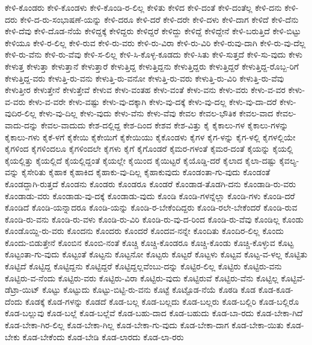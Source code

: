 {ಕೇಳಿ-ಕೊಂಡರು
ಕೇಳಿ-ಕೊಂಡಳು
ಕೇಳಿ-ಕೊಂಡಿ-ರ-ಲಿಲ್ಲ
ಕೇಳಿತು
ಕೇಳಿದ
ಕೇಳಿ-ದಂತೆ
ಕೇಳಿ-ದಂತೆಲ್ಲ
ಕೇಳಿ-ದನು
ಕೇಳಿ-ದರು
ಕೇಳಿ-ದ-ರು-ಸಂಭಾಷಣೆ-ಯನ್ನು
ಕೇಳಿ-ದರೂ
ಕೇಳಿ-ದರೆ
ಕೇಳಿ-ದರೇ
ಕೇಳಿ-ದಳು
ಕೇಳಿ-ದಾಗ
ಕೇಳಿದೆ
ಕೇಳಿ-ದೆನು
ಕೇಳಿ-ದೆವು
ಕೇಳಿ-ದೊಡ-ನೆಯೆ
ಕೇಳಿದ್ದಕ್ಕೆ
ಕೇಳಿದ್ದರು
ಕೇಳಿದ್ದರೆ
ಕೇಳಿದ್ದು
ಕೇಳಿದ್ದೆ
ಕೇಳಿದ್ದೇನೆ
ಕೇಳಿ-ಬರುತ್ತಿದೆ
ಕೇಳಿ-ಬಿಟ್ಟು
ಕೇಳಿಯೂ
ಕೇಳಿ-ರ-ಲಿಲ್ಲ
ಕೇಳಿ-ರುವ
ಕೇಳಿ-ರು-ವರು
ಕೇಳಿ-ರು-ವಿರಾ
ಕೇಳಿ-ರು-ವಿರಿ
ಕೇಳಿ-ರುವು-ದಾಗಿ
ಕೇಳಿ-ರು-ವು-ದೆಲ್ಲ
ಕೇಳಿ-ರು-ವೆನು
ಕೇಳಿ-ರು-ವೆವು
ಕೇಳಿ-ಸ-ಲಿಲ್ಲ
ಕೇಳಿ-ಸಿ-ಕೊಳ್ಳ-ಕೂಡದು
ಕೇಳಿ-ಸಿತು
ಕೇಳಿ-ಸುತ್ತದೆ
ಕೇಳಿ-ಸು-ವುದು
ಕೇಳು
ಕೇಳುತ್ತ
ಕೇಳುತ್ತಾ
ಕೇಳುತ್ತಾನೆ
ಕೇಳುತ್ತಾರೆ
ಕೇಳುತ್ತಿದ್ದ
ಕೇಳುತ್ತಿದ್ದನು
ಕೇಳುತ್ತಿದ್ದರು
ಕೇಳುತ್ತಿದ್ದರೆ
ಕೇಳುತ್ತಿದ್ದ-ರೊಬ್ಬ-ರಿಗೆ
ಕೇಳುತ್ತಿದ್ದ-ವರು
ಕೇಳುತ್ತಿ-ರು-ವನು
ಕೇಳುತ್ತಿ-ರು-ವನೋ
ಕೇಳುತ್ತಿ-ರು-ವರು
ಕೇಳುತ್ತಿ-ರು-ವಿರಿ
ಕೇಳುತ್ತಿ-ರು-ವೆವು
ಕೇಳುತ್ತೀರ
ಕೇಳುತ್ತೇನೆ
ಕೇಳುತ್ತೇವೆ
ಕೇಳುವ
ಕೇಳು-ವಂತಹ
ಕೇಳು-ವಂತೆ
ಕೇಳು-ವನು
ಕೇಳು-ವರು
ಕೇಳು-ವ-ವರ
ಕೇಳು-ವ-ವರು
ಕೇಳು-ವ-ವರೇ
ಕೇಳು-ವಷ್ಟು
ಕೇಳು-ವು-ದಕ್ಕಾಗಿ
ಕೇಳು-ವು-ದಕ್ಕೆ
ಕೇಳು-ವು-ದಲ್ಲ
ಕೇಳು-ವು-ದಾ-ದರೆ
ಕೇಳು-ವುದಿರ-ಲಿಲ್ಲ
ಕೇಳು-ವು-ದಿಲ್ಲ
ಕೇಳು-ವುದು
ಕೇಳು-ವೆನು
ಕೇಳು-ವೆವು
ಕೇವಲ
ಕೇವಲ-ಭೌತಿಕ
ಕೇವಲ-ವಾದ
ಕೇವಲ-ವಾದು-ದನ್ನು
ಕೇವಲ-ವಾದುದು
ಕೇಶ-ದಲ್ಲಿದ್ದ
ಕೇಶ-ದಿಂದ
ಕೇಶವ
ಕೇಶ-ವಿತ್ತು
ಕೈ
ಕೈಕಾಲು-ಗಳ
ಕೈಕಾಲು-ಗಳನ್ನು
ಕೈಕಾಲು-ಗಳು
ಕೈಕೆ-ಳಗೆ
ಕೈಕೇಯಿ
ಕೈಕೇಯಿಗೆ
ಕೈಕೇಯಿಯು
ಕೈಕೊಂಡಳು
ಕೈಗಳ
ಕೈಗ-ಳನ್ನು
ಕೈಗ-ಳಲ್ಲಿ
ಕೈಗಳಲ್ಲಿಯೇ
ಕೈಗಳಿಂದ
ಕೈಗಳಿಂದಲೂ
ಕೈಗಳಿಂದಲೇ
ಕೈಗಳು
ಕೈಗೆ
ಕೈಗೊಂಡರೆ
ಕೈಮರ-ಗಳಂತೆ
ಕೈಮರ-ದಂತೆ
ಕೈಯನ್ನು
ಕೈಯಲ್ಲಿ
ಕೈಯಲ್ಲಿತ್ತು
ಕೈಯಲ್ಲಿದೆ
ಕೈಯಲ್ಲಿದ್ದಂತೆ
ಕೈಯಲ್ಲೇ
ಕೈಯಿಂದ
ಕೈಯಿಟ್ಟರೆ
ಕೈಯೊಡ್ಡಿ-ದರೆ
ಕೈಲಾದ
ಕೈಲಾ-ದಷ್ಟು
ಕೈವಲ್ಯ-ವನ್ನು
ಕೈಸೇರಿತು
ಕೈಹಾಕ
ಕೈಹಾಕಿದ
ಕೈಹಾಕು-ವು-ದಿಲ್ಲ
ಕೈಹಾಕುವುದು
ಕೊಂಡಂತಾ-ಗು-ವುದು
ಕೊಂಡಂತೆ
ಕೊಂಡದ್ದಾಗಿ-ರುತ್ತದೆ
ಕೊಂಡನು
ಕೊಂಡರು
ಕೊಂಡರೂ
ಕೊಂಡರೆ
ಕೊಂಡಾಡ-ತೊಡಗಿ-ದನು
ಕೊಂಡಾಡಿ-ರು-ವರು
ಕೊಂಡಾಡು-ವರು
ಕೊಂಡಾಡು-ವು-ದಕ್ಕೆ
ಕೊಂಡಾಡು-ವುದು
ಕೊಂಡಿ
ಕೊಂಡಿ-ಗಳನ್ನೆಲ್ಲಾ
ಕೊಂಡಿ-ಗಳು
ಕೊಂಡಿ-ದರೆ
ಕೊಂಡಿದೆ
ಕೊಂಡಿ-ಯನ್ನಾದರೂ
ಕೊಂಡಿ-ಯನ್ನು
ಕೊಂಡಿ-ರ-ಬೇಕೆಂದಿದ್ದರು
ಕೊಂಡಿ-ರಲೇ-ಬೇಕೆಂದರೆ
ಕೊಂಡಿ-ರುವ
ಕೊಂಡಿ-ರು-ವನು
ಕೊಂಡಿ-ರು-ವಳು
ಕೊಂಡಿ-ರು-ವಿರಿ
ಕೊಂಡಿ-ರು-ವು-ದ-ರಿಂದ
ಕೊಂಡಿ-ರು-ವೆವು
ಕೊಂಡಿಲ್ಲ
ಕೊಂಡು
ಕೊಂಡೊಯ್ದಿ-ರು-ವರು
ಕೊಂದನು
ಕೊಂದರು
ಕೊಂದರೆ
ಕೊಂದವ-ನನ್ನೇ
ಕೊಂದಿತು
ಕೊಂದಿರ-ಲಿಲ್ಲ
ಕೊಂದು
ಕೊಂದು-ಬಿಡುತ್ತೇನೆ
ಕೊಂಬಿನ
ಕೊಂಬಿ-ನಂತೆ
ಕೊಚ್ಚಿ
ಕೊಚ್ಚಿ-ಕೊಂಡರೂ
ಕೊಚ್ಚಿ-ಕೊಂಡು
ಕೊಚ್ಚಿ-ಕೊಳ್ಳುವ
ಕೊಟ್ಟ
ಕೊಟ್ಟಂತಾ-ಗು-ವುದು
ಕೊಟ್ಟಂತೆ
ಕೊಟ್ಟನು
ಕೊಟ್ಟನೋ
ಕೊಟ್ಟರು
ಕೊಟ್ಟರೆ
ಕೊಟ್ಟಳು
ಕೊಟ್ಟವ
ಕೊಟ್ಟ-ವ-ಳಲ್ಲ
ಕೊಟ್ಟಿತು
ಕೊಟ್ಟಿದೆ
ಕೊಟ್ಟಿದ್ದ
ಕೊಟ್ಟಿದ್ದನು
ಕೊಟ್ಟಿದ್ದರೆ
ಕೊಟ್ಟಿದ್ದಲ್ಲವೆಂಬು-ದನ್ನು
ಕೊಟ್ಟಿರ-ಲಿಲ್ಲ
ಕೊಟ್ಟಿರು
ಕೊಟ್ಟಿರು-ವನು
ಕೊಟ್ಟಿರು-ವ-ನೆಂದು
ಕೊಟ್ಟಿರು-ವರು
ಕೊಟ್ಟಿರು-ವಿರಾ
ಕೊಟ್ಟಿರು-ವುದು
ಕೊಟ್ಟಿರುವೆ
ಕೊಟ್ಟಿರು-ವೆನು
ಕೊಟ್ಟಿಲ್ಲ
ಕೊಟ್ಟಿವೆ-ಡೆಟ್ರಾ-ಯಿಟ್
ಕೊಟ್ಟು
ಕೊಟ್ಟುದು
ಕೊಟ್ಟು-ಬಿಟ್ಟಿ-ರು-ವನು
ಕೊಟ್ಟೆ
ಕೊಟ್ಟೊಡ-ನೆಯೆ
ಕೊಠಡಿ
ಕೊಡ
ಕೊಡ-ಕೂಡ-ದೆಂದು
ಕೊಡಕ್ಕೆ
ಕೊಡ-ಗಳನ್ನು
ಕೊಡದೆ
ಕೊಡ-ಬಲ್ಲ
ಕೊಡ-ಬಲ್ಲದು
ಕೊಡ-ಬಲ್ಲರು
ಕೊಡ-ಬಲ್ಲಿರಿ
ಕೊಡ-ಬಲ್ಲಿರೊ
ಕೊಡ-ಬಲ್ಲುವು
ಕೊಡ-ಬಲ್ಲೆ
ಕೊಡ-ಬಲ್ಲೆವೆ
ಕೊಡ-ಬಹು-ದಾದ
ಕೊಡ-ಬಹುದು
ಕೊಡ-ಬಾ-ರದು
ಕೊಡ-ಬೇಕಾ-ಗಿದೆ
ಕೊಡ-ಬೇಕಾ-ಗಿರ-ಲಿಲ್ಲ
ಕೊಡ-ಬೇಕಾ-ಗಿಲ್ಲ
ಕೊಡ-ಬೇಕಾ-ಗು-ವುದು
ಕೊಡ-ಬೇಕಾ-ದಾಗ
ಕೊಡ-ಬೇಕಾ-ಯಿತು
ಕೊಡ-ಬೇಕು
ಕೊಡ-ಬೇಕೆಂದು
ಕೊಡ-ಬೇಡಿ
ಕೊಡ-ಲಾರದು
ಕೊಡ-ಲಾ-ರರು
}
